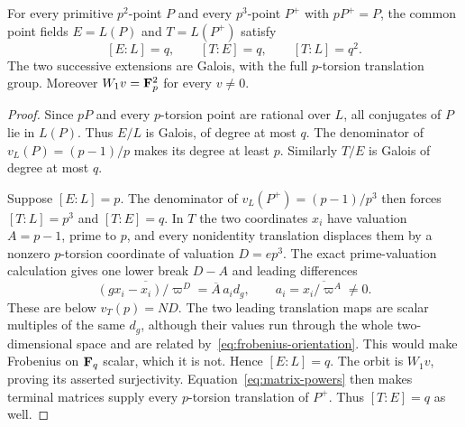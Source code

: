 \begin{lemma}\label{lem:full-point-orbits}
For every primitive $p^2$-point $P$ and every $p^3$-point $P^+$ with $pP^+=P$, the common point fields $E=L(P)$ and $T=L(P^+)$ satisfy
\[
                [E:L]=q,\qquad[T:E]=q,\qquad[T:L]=q^2.
\]
The two successive extensions are Galois, with the full $p$-torsion translation group. Moreover $W_1v=\mathbf F_p^2$ for every $v\ne0$.
\end{lemma}
\begin{proof}
Since $pP$ and every $p$-torsion point are rational over $L$, all conjugates of $P$ lie in $L(P)$. Thus $E/L$ is Galois, of degree at most $q$. The denominator of $v_L(P)=(p-1)/p$ makes its degree at least $p$. Similarly $T/E$ is Galois of degree at most $q$.

Suppose $[E:L]=p$. The denominator of $v_L(P^+)=(p-1)/p^3$ then forces $[T:L]=p^3$ and $[T:E]=q$. In $T$ the two coordinates $x_i$ have valuation $A=p-1$, prime to $p$, and every nonidentity translation displaces them by a nonzero $p$-torsion coordinate of valuation $D=ep^3$. The exact prime-valuation calculation gives one lower break $D-A$ and leading differences
\[
       \overline{(gx_i-x_i)/\varpi^D}=\overline A\,a_i d_g,
       \qquad a_i=\overline{x_i/\varpi^A}\ne0.
\]
These are below $v_T(p)=ND$. The two leading translation maps are scalar multiples of the same $d_g$, although their values run through the whole two-dimensional space and are related by~\eqref{eq:frobenius-orientation}. This would make Frobenius on $\mathbf F_q$ scalar, which it is not. Hence $[E:L]=q$. The orbit is $W_1v$, proving its asserted surjectivity. Equation~\eqref{eq:matrix-powers} then makes terminal matrices supply every $p$-torsion translation of $P^+$. Thus $[T:E]=q$ as well.
\end{proof}

